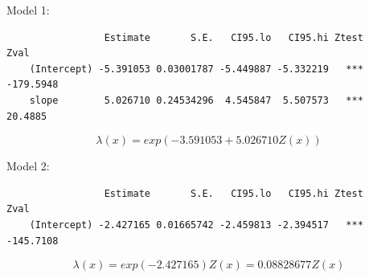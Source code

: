 \documentclass{article}
\begin{document}
Model 1:
\begin{verbatim}
                 Estimate       S.E.   CI95.lo   CI95.hi Ztest      Zval
    (Intercept) -5.391053 0.03001787 -5.449887 -5.332219   *** -179.5948
    slope        5.026710 0.24534296  4.545847  5.507573   ***   20.4885
\end{verbatim}
\[\lambda(x) = exp(-3.591053 + 5.026710 Z(x))\]

Model 2:
\begin{verbatim}
                 Estimate       S.E.   CI95.lo   CI95.hi Ztest      Zval
    (Intercept) -2.427165 0.01665742 -2.459813 -2.394517   *** -145.7108
\end{verbatim}
\[\lambda(x) = exp(-2.427165) Z(x) =  0.08828677 Z(x)\]

\end{document}
